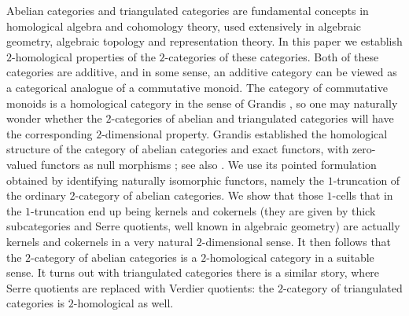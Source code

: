 \documentclass[11pt,reqno,a4paper]{amsart}
\theoremstyle{definition}
\theoremstyle{remark}
\newcommand{\0}{\mathbf{0}}
\renewcommand{\1}{\mathbf{1}}
\begin{document}
Abelian categories and triangulated categories are fundamental concepts in homological algebra and cohomology theory, used extensively in algebraic geometry, algebraic topology and representation theory. In this paper we establish $2$-homological properties of the $2$-categories of these categories. Both of these categories are additive, and in some sense, an additive category can be viewed as a categorical analogue of a commutative monoid. The category of commutative monoids is a homological category in the sense of Grandis \cite{Grandis13}, so one may naturally wonder whether the $2$-categories of abelian and triangulated categories will have the corresponding $2$-dimensional property. Grandis established the homological structure of the category of abelian categories and exact functors, with zero-valued functors as null morphisms \cite[Section~1.9, p.~146]{Grandis92}; see also \cite[Section~5.6]{Grandis13}. We use its pointed formulation obtained by identifying naturally isomorphic functors, namely the $1$-truncation of the ordinary $2$-category of abelian categories. We show that those $1$-cells that in the $1$-truncation end up being kernels and cokernels (they are given by thick subcategories and Serre quotients, well known in algebraic geometry) are actually kernels and cokernels in a very natural $2$-dimensional sense. It then follows that the $2$-category of abelian categories is a $2$-homological category in a suitable sense. It turns out with triangulated categories there is a similar story, where Serre quotients are replaced with Verdier quotients: the $2$-category of triangulated categories is $2$-homological as well.
\end{document}
